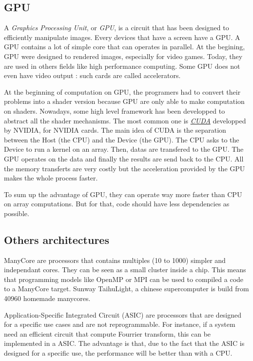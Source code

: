 \subsection{GPU}
A \emph{Graphics Processing Unit}, or \emph{GPU}, is a circuit that has been designed to efficiently manipulate images. Every devices that have a screen have a GPU. A GPU contains a lot of simple core that can operates in parallel. At the begining, GPU were designed to rendered images, especially for video games. Today, they are used in others fields like high performance computing. Some GPU does not even have video output : such cards are called accelerators.

At the beginning of computation on GPU, the programers had to convert their problems into a shader version because GPU are only able to make computation on shaders. Nowadays, some high level framework has been developped to abstract all the shader mechanisms. The most common one is \href{https://developer.nvidia.com/cuda-zone}{\emph{CUDA}} developped by NVIDIA, for NVIDIA cards. The main idea of CUDA is the separation between the Host (the CPU) and the Device (the GPU). The CPU asks to the Device to run a kernel on an array. Then, datas are transfered to the GPU. The GPU operates on the data and finally the results are send back to the CPU. All the memory transferts are very costly but the acceleration provided by the GPU makes the whole process faster. 

To sum up the advantage of GPU, they can operate way more faster than CPU on array computations. But for that, code should have less dependencies as possible.

\subsection{Others architectures}
ManyCore are processors that contains multiples (10 to 1000) simpler and independant cores. They can be seen as a small cluster inside a chip. This means that programming models like OpenMP or MPI can be used to compiled a code to a ManyCore target. Sunway TaihuLight, a chinese supercomputer is build from 40960 homemade manycores.

Application-Specific Integrated Circuit (ASIC) are processors that are designed for a specific use cases and are not reprogrammable. For instance, if a system need an efficient circuit that compute Fourrier transform, this can be implemented in a ASIC. The advantage is that, due to the fact that the ASIC is designed for a specific use, the performance will be better than with a CPU.

